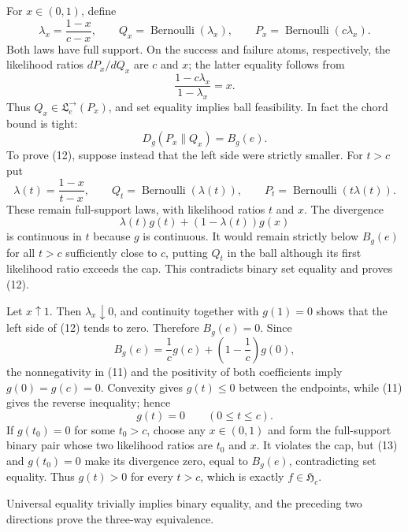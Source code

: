 For \(x\in(0,1)\), define
\[
 \lambda_x=\frac{1-x}{c-x},\qquad
 Q_x=\operatorname{Bernoulli}(\lambda_x),\qquad
 P_x=\operatorname{Bernoulli}(c\lambda_x).
\]
Both laws have full support.  On the success and failure atoms, respectively, the likelihood ratios \(dP_x/dQ_x\) are \(c\) and \(x\); the latter equality follows from
\[
 \frac{1-c\lambda_x}{1-\lambda_x}=x.
\]
Thus \(Q_x\in\mathfrak L^{\to}_e(P_x)\), and set equality implies ball feasibility.  In fact the chord bound is tight:
\[
 D_g(P_x\|Q_x)=B_g(e). \tag{12}
\]
To prove (12), suppose instead that the left side were strictly smaller.  For \(t>c\) put
\[
 \lambda(t)=\frac{1-x}{t-x},\qquad
 Q_t=\operatorname{Bernoulli}(\lambda(t)),\qquad
 P_t=\operatorname{Bernoulli}(t\lambda(t)).
\]
These remain full-support laws, with likelihood ratios \(t\) and \(x\).  The divergence
\[
 \lambda(t)g(t)+(1-\lambda(t))g(x)
\]
is continuous in \(t\) because \(g\) is continuous.  It would remain strictly below \(B_g(e)\) for all \(t>c\) sufficiently close to \(c\), putting \(Q_t\) in the ball although its first likelihood ratio exceeds the cap.  This contradicts binary set equality and proves (12).

Let \(x\uparrow1\).  Then \(\lambda_x\downarrow0\), and continuity together with \(g(1)=0\) shows that the left side of (12) tends to zero.  Therefore \(B_g(e)=0\).  Since
\[
 B_g(e)=\frac1c g(c)+\left(1-\frac1c\right)g(0),
\]
the nonnegativity in (11) and the positivity of both coefficients imply \(g(0)=g(c)=0\).  Convexity gives \(g(t)\le0\) between the endpoints, while (11) gives the reverse inequality; hence
\[
 g(t)=0\qquad(0\le t\le c). \tag{13}
\]
If \(g(t_0)=0\) for some \(t_0>c\), choose any \(x\in(0,1)\) and form the full-support binary pair whose two likelihood ratios are \(t_0\) and \(x\).  It violates the cap, but (13) and \(g(t_0)=0\) make its divergence zero, equal to \(B_g(e)\), contradicting set equality.  Thus \(g(t)>0\) for every \(t>c\), which is exactly \(f\in\mathfrak H_c\).

Universal equality trivially implies binary equality, and the preceding two directions prove the three-way equivalence.